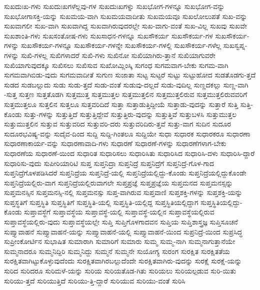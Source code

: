 {ಸುಖದುಃಖ-ಗಳು
ಸುಖದುಃಖಗಳೆಲ್ಲವು-ಗಳ
ಸುಖದುಃಖಗಳ್ನು
ಸುಖಭೋಗ-ಗಳನ್ನೂ
ಸುಖಭೋಗ-ವನ್ನು
ಸುಖಭೋಗಾಸಕ್ತಿ-ಯನ್ನು
ಸುಖಮಯ-ವಾಗಿ
ಸುಖಮಯವಾದೀತು
ಸುಖಮಯವೂ
ಸುಖಲೋಲುಪತೆ
ಸುಖ-ವನ್ನು
ಸುಖವಾಗಲೀ
ಸುಖ-ವಾಗಿ
ಸುಖವಾಗಿದ್ದ
ಸುಖವಾಗಿರುವುದರಲ್ಲೇ
ಸುಖ-ವಾಗು-ವಂತೆ
ಸುಖ-ವಿಲ್ಲ
ಸುಖವು
ಸುಖವೇ
ಸುಖಶಾಂತಿ-ಗಳು
ಸುಖಸಂತೋಷ-ಗಳು
ಸುಖಸಾಧನ-ಗಳನ್ನೂ
ಸುಖಸೌಕರ್ಯ
ಸುಖಸೌಕರ್ಯ-ಗಳ
ಸುಖಸೌಕರ್ಯ-ಗಳನ್ನು
ಸುಖಸೌಕರ್ಯ-ಗಳನ್ನೂ
ಸುಖಸೌಕರ್ಯ-ಗಳನ್ನೇ
ಸುಖಸೌಕರ್ಯ-ಗಳಲ್ಲಿ
ಸುಖಸೌಕರ್ಯ-ಗಳೆಲ್ಲ
ಸುಖಸ್ವಪ್ನ-ಗಳನ್ನು
ಸುಖಿ-ಗಳಲ್ಲ
ಸುಖಿಗಳಾದರೆ
ಸುಖಿ-ಗಳು
ಸುಖಿನೋ
ಸುಖಿಯಾಗಿರು-ತ್ತಾನೆ
ಸುಖಿಯಾಗುವರೇ
ಸುಖಿಯಾಗುವುದಕ್ಕೂ
ಸುಖಿಸಲು
ಸುಖಿಸುವ
ಸುಖೋಮ್ಲಿಂಸ್ಕಿ
ಸುಗಂಧ
ಸುಗಮವಾಗ-ಬೇಕು
ಸುಗಮ-ವಾಗಿ
ಸುಗಮವಾಗಿಬಿಡು-ವುದು
ಸುಗಮವಾದೀತೆ
ಸುಗುಣ
ಸುಜಾತಾ
ಸುಟ್ಟ
ಸುಟ್ಟರೆ
ಸುಟ್ಟು
ಸುಟ್ಟುಹೋದ
ಸುಡತೊಡಗು-ತ್ತದೆ
ಸುಡದ
ಸುಡಬಲ್ಲುದು
ಸುಡು
ಸುಡು-ತ್ತದೆ
ಸುಡು-ವಂತೆ
ಸುಡುವು-ದಲ್ಲದೆ
ಸುಡು-ವುದಿಲ್ಲ
ಸುಣ್ಣದಕಲ್ಲು
ಸುಣ್ಣ-ವಾಗಿ
-ಸುತ್ತ
ಸುತ್ತಣ
ಸುತ್ತತೊಡಗಿ
ಸುತ್ತಮುತ್ತ
ಸುತ್ತಮುತ್ತಲ
ಸುತ್ತಮುತ್ತಲಿನ
ಸುತ್ತಮುತ್ತಲಿರುವ
ಸುತ್ತಮುತ್ತಲಿರುವವರಿಗೆ
ಸುತ್ತಮುತ್ತಲೂ
ಸುತ್ತಲಿನ
ಸುತ್ತಲೂ
ಸುತ್ತವರಿದಿದೆ
ಸುತ್ತಾ
ಸುತ್ತಾಡುತ್ತಿದ್ದೀಯೆ
ಸುತ್ತಾಡು-ವುದನ್ನು
ಸುತ್ತಾರೆ
ಸುತ್ತಿ
ಸುತ್ತಿ-ಕೊಂಡು
ಸುತ್ತು-ಗಳನ್ನು
ಸುತ್ತುತ್ತಿದೆ
ಸುತ್ತುತ್ತಿದ್ದೇವೆ
ಸುತ್ತುತ್ತಿರು-ವುದನ್ನು
ಸುತ್ತುತ್ತಿವೆ
ಸುತ್ತುಬಳಸಿ
ಸುತ್ತುಮುತ್ತಲ
ಸುತ್ತುಮುತ್ತಲಿನ
ಸುತ್ತುವ
ಸುತ್ತುವರಿದ
ಸುತ್ತುವರಿ-ದರು
ಸುತ್ತುವರಿದಿರು-ತ್ತವೆ
ಸುತ್ತು-ವಾಗ
ಸುದಿನ
ಸುದೂರ
ಸುದೂರಭವಿಷ್ಯ-ವನ್ನು
ಸುದೈವ-ದಿಂದ
ಸುದ್ದಿ
ಸುದ್ದಿ-ಗಿಂತಲೂ
ಸುದ್ದಿಯೇ
ಸುಧಾ
ಸುಧಾರಕ
ಸುಧಾರಕರೂ
ಸುಧಾರಣಾ
ಸುಧಾರಣಾಕಾರ್ಯ-ವನ್ನು
ಸುಧಾರಣಾವಾದಿ-ಗಳು
ಸುಧಾರಣೆ
ಸುಧಾರಣೆ-ಗಳನ್ನು
ಸುಧಾರಣೆಗಳಾಗ-ಬೇಕು
ಸುಧಾರಣೆಯ
ಸುಧಾರಣೆ-ಯಿಂದ
ಸುಧಾರಿತ
ಸುಧಾರಿಸಲು
ಸುಧಾರಿಸಿತು
ಸುಧಾರಿಸಿದ
ಸುಧಾರಿಸಿ-ದಳು
ಸುಧಾರಿಸಿ-ದ್ದಾರೆ
ಸುಧಾರಿಸು-ವುದು
ಸುಪೀರಿಯಾರಿಟಿ
ಸುಪ್ತ
ಸುಪ್ತನಿದ್ರಾ
ಸುಪ್ತನಿದ್ರೆ
ಸುಪ್ತನಿದ್ರೆಗೆ
ಸುಪ್ತನಿದ್ರೆ-ಗೊಳ-ಗಾದ
ಸುಪ್ತನಿದ್ರೆಗೊಳಪಡಿಸಿದರೆ
ಸುಪ್ತನಿದ್ರೆಯ
ಸುಪ್ತನಿದ್ರೆ-ಯಲ್ಲಿ
ಸುಪ್ತನಿದ್ರೆಯಲ್ಲಿದ್ದು-ಕೊಂಡು
ಸುಪ್ತನಿದ್ರೆಯಲ್ಲಿದ್ದುಕೊಂಡೇ
ಸುಪ್ತನಿದ್ರೆಯಲ್ಲಿರು-ವಾಗ
ಸುಪ್ತನಿದ್ರೆಯಲ್ಲಿರುವಾಗಲೇ
ಸುಪ್ತಪ್ರಜ್ಞೆ
ಸುಪ್ತಪ್ರಜ್ಞೆಯ
ಸುಪ್ತಮನದ
ಸುಪ್ತಮನಸ್ಸನ್ನು
ಸುಪ್ತಮನಸ್ಸಿನ
ಸುಪ್ತಮನಸ್ಸಿ-ನಲ್ಲಿ
ಸುಪ್ತಮನಸ್ಸು
ಸುಪ್ತ-ವಾಗಿರುವ
ಸುಪ್ತವಾಣಿ
ಸುಪ್ತಶಕ್ತಿ-ಗಳನ್ನು
ಸುಪ್ತಶಕ್ತಿ-ಯನ್ನು
ಸುಪ್ತಸ್ಥತಿಗೆ
ಸುಪ್ತಸ್ಥಿತಿ
ಸುಪ್ತಸ್ಥಿತಿಗೆ
ಸುಪ್ತಸ್ಥಿತಿ-ಯಲ್ಲಿ
ಸುಪ್ತಸ್ಥಿತಿ-ಯಲ್ಲಿದ್ದ
ಸುಪ್ತಸ್ಥಿತಿಯಲ್ಲಿದ್ದಾಗ
ಸುಪ್ತಸ್ಥಿತಿಯಲ್ಲಿದ್ದು-ಕೊಂಡು
ಸುಪ್ತಾವಸ್ಥೆಗೆ
ಸುಪ್ತಾವಸ್ಥೆಯ
ಸುಪ್ತಾವಸ್ಥೆ-ಯಲ್ಲಿ
ಸುಪ್ತಾವಸ್ಥೆ-ಯಲ್ಲಿನ
ಸುಪ್ತಾವಸ್ಥೆಯಲ್ಲಿರುವ
ಸುಪ್ತಾವಸ್ಥೆಯಲ್ಲಿರು-ವುದು
ಸುಪ್ತಾವಸ್ಥೆಯಲ್ಲೇ
ಸುಪ್ತಿ
ಸುಪ್ತಿಗೊಳಗಾದವನ
ಸುಪ್ತಿಯ
ಸುಪ್ತಿಶಾಸ್ತ್ರಜ್ಞ
ಸುಪ್ತಿಸೂಚನೆ
ಸುಪ್ತ್ಯಾವಾಹನೆ
ಸುಪ್ತ್ಯಾವಾಹನೆ-ಯನ್ನು
ಸುಪ್ತ್ಯಾವಾಹನೆ-ಯಲ್ಲಿ
ಸುಪ್ತ್ಯಾವಾಹನೆ-ಯಿಂದ
ಸುಪ್ರನಿದ್ರೆ-ಯಿಂದ
ಸುಪ್ರಸಿದ್ಧ
ಸುಪ್ರೀಂಕೋರ್ಟಿನ
ಸುಭಾಷಿತ
ಸುಮಾರಾಗಿ
ಸುಮಾರಿಗೆ
ಸುಮಾರು
ಸುಮ್ಮ
ಸುಮ್ಮ-ನಾಗಿ
ಸುಮ್ಮನಾಗುತ್ತಾನೆಯೇ
ಸುಮ್ಮನಾದರೂ
ಸುಮ್ಮನಿದ್ದಿರಿ
ಸುಮ್ಮನಿದ್ದು
ಸುಮ್ಮನೆ
ಸುಮ್ಮನೇ
ಸುಯೋಗ್ಯ
ಸುರಂಗ
ಸುರಕ್ಷಿತ
ಸುರಕ್ಷಿತತೆಯ
ಸುರಕ್ಷಿತವಾಗಿಟ್ಟುಕೊಳ್ಳುವುದೆಂದು
ಸುರಕ್ಷಿತವಾಗಿರಬಲ್ಲುದೆಂದೇ
ಸುರಕ್ಷಿತವಾಗಿರು-ವುದನ್ನು
ಸುರಕ್ಷೆ
ಸುರಕ್ಷೆ-ಯನ್ನು
ಸುರಿದ
ಸುರಿದರೂ
ಸುರಿಮಳೆ-ಯನ್ನು
ಸುರಿಯ
ಸುರಿಯತೊಡ-ಗಿತು
ಸುರಿಯಲು
ಸುರಿಯಲ್ಪಡುವ
ಸುರಿ-ಯಿತು
ಸುರಿಯು-ತ್ತದೆ
ಸುರಿಯುತ್ತಿದೆ
ಸುರಿಯು-ತ್ತಿ-ದ್ದಾರೆ
ಸುರಿಯುವ
ಸುರಿಯು-ವಂತೆ
ಸುರಿಸಿ
}
